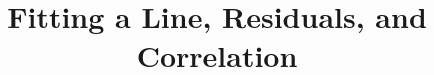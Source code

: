 \documentclass{beamer}
\title[MA205 - Section 8.1]{Fitting a Line, Residuals, and Correlation}
\begin{document}
\begin{frame}
  \titlepage
\end{frame}
\end{document}
